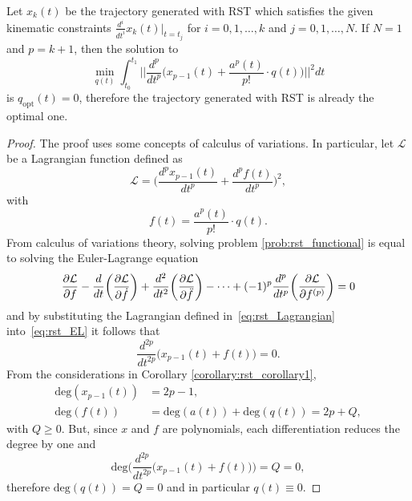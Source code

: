 \begin{lemma}
\label{lemma:rst_Lemma5}
Let $x_k(t)$ be the trajectory generated with RST which satisfies the given kinematic constraints $\frac{d^i}{dt^i}x_k(t)\bigr|_{t=t_j}$ for $i=0,1,\dots, k$ and $j=0,1,\dots, N$. If $N=1$ and $p=k+1$, then the solution to
\begin{equation}
\label{prob:rst_functional}
\min_{q(t)}{\int_{t_0}^{t_1}{\biggl|\biggl|\frac{d^p}{dt^p}\biggl(x_{p-1}(t)+\frac{a^p(t)}{p!}\cdot q(t)\biggr)\biggr|\biggr|^2 dt}}
\end{equation}
is $q_{\text{opt}}(t)=0$, therefore the trajectory generated with RST is already the optimal one.
\end{lemma}

\begin{proof}
The proof uses some concepts of calculus of variations. In particular, let $\mathcal{L}$ be a Lagrangian function defined as 
\begin{equation}
\label{eq:rst_Lagrangian}
\mathcal{L} = \biggl(\frac{d^p x_{p-1}(t)}{dt^p}+\frac{d^p f(t)}{dt^p}\biggr)^2,
\end{equation}
with 
\begin{equation}
f(t) = \frac{a^p(t)}{p!}\cdot q(t).
\end{equation}
From calculus of variations theory, solving problem \eqref{prob:rst_functional} is equal to solving the Euler-Lagrange equation
\begin{equation}
\small
\label{eq:rst_EL}
\frac{\partial \mathcal{L}}{\partial f} - \frac{d}{dt}\biggl(\frac{\partial \mathcal{L}}{\partial \dot{f}}\biggr)+ \frac{d^2}{dt^2}\biggl(\frac{\partial \mathcal{L}}{\partial \ddot{f}}\biggr)-\dots+(-1)^{p}\frac{d^{p}}{dt^{p}}\biggl(\frac{\partial \mathcal{L}}{\partial f^{(p)}}\biggr)=0
\end{equation}
and by substituting the Lagrangian defined in~\eqref{eq:rst_Lagrangian} into~\eqref{eq:rst_EL}
it follows that 
\begin{equation}
\frac{d^{2p}}{dt^{2p}}\biggl(x_{p-1}(t)+f(t)\biggr)=0.
\end{equation}
From the considerations in Corollary \ref{corollary:rst_corollary1}, 
\begin{align}
\text{deg}(x_{p-1}(t))&=2p-1, \nonumber \\
\text{deg}(f(t))&= \text{deg}(a(t))+\text{deg}(q(t)) = 2p+Q,
\end{align}
with $Q\geq 0$. But, since $x$ and $f$ are polynomials, each differentiation reduces the degree by one and
\begin{equation}
\text{deg}\Bigg(\frac{d^{2p}}{dt^{2p}}\biggl(x_{p-1}(t)+f(t)\biggr)\Biggr)=Q=0,
\end{equation}
therefore $\text{deg}(q(t))=Q=0$ and in particular $q(t)\equiv 0$. \qedhere
\end{proof}
